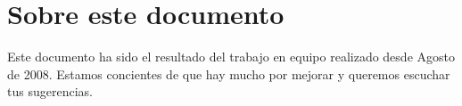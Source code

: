 \chapter*{Sobre este documento}\label{chap:lessons}
%

Este documento ha sido el resultado del trabajo en equipo realizado desde Agosto de 2008.
Estamos concientes de que hay mucho por mejorar y queremos escuchar tus sugerencias.

%
%
